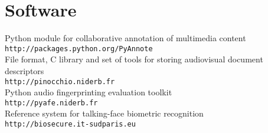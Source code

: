 \section{Software}

Python module for collaborative annotation of multimedia content\\
\texttt{\small http://packages.python.org/PyAnnote}\\

File format, C library and set of tools for storing audiovisual document descriptors\\
\texttt{\small http://pinocchio.niderb.fr}\\

Python audio fingerprinting evaluation toolkit\\
\texttt{\small http://pyafe.niderb.fr} \cite{Ramona2011}\\

Reference system for talking-face biometric recognition\\
\texttt{\small http://biosecure.it-sudparis.eu} \cite{Bredin2006a}
